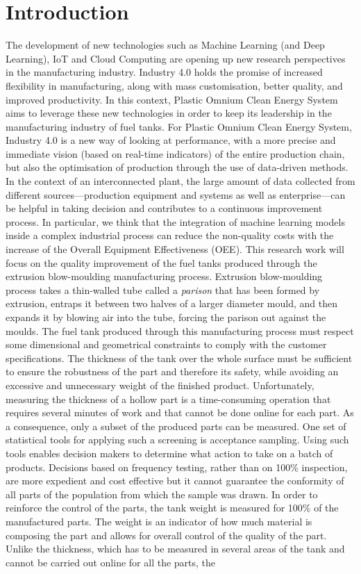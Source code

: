 \chapter*{Introduction}
\thispagestyle{empty}


The development of new technologies such as Machine Learning (and Deep Learning), IoT and Cloud Computing are opening up new research perspectives in the manufacturing industry. Industry 4.0 holds the promise of increased flexibility in manufacturing, along with mass customisation, better quality, and improved productivity. In this context, Plastic Omnium Clean Energy System aims to leverage these new technologies in order to keep its leadership in the manufacturing industry of fuel tanks. For Plastic Omnium Clean Energy System, Industry 4.0 is a new way of looking at performance, with a more precise and immediate vision (based on real-time indicators) of the entire production chain, but also the optimisation of production through the use of data-driven methods. In the context of an interconnected plant, the large amount of data collected from different sources—production equipment and systems as well as enterprise—can be helpful in taking decision and contributes to a continuous improvement process. In particular, we think that the integration of machine learning models inside a complex industrial process can reduce the non-quality costs with the increase of the Overall Equipment Effectiveness (OEE). This research work will focus on the quality improvement of the fuel tanks produced through the extrusion blow-moulding manufacturing process. Extrusion blow-moulding process takes a thin-walled tube called a \textit{parison} that has been formed by extrusion, entraps it between two halves of a larger diameter mould, and then expands it by blowing air into the tube, forcing the parison out against the moulds. The fuel tank produced through this manufacturing process must respect some dimensional and geometrical constraints to comply with the customer specifications. The thickness of the tank over the whole surface must be sufficient to ensure the robustness of the part and therefore its safety, while avoiding an excessive and unnecessary weight of the finished product. Unfortunately, measuring the thickness of a hollow part is a time-consuming operation that requires several minutes of work and that cannot be done online for each part. As a consequence, only a subset of the produced parts can be measured. One set of statistical tools for applying such a screening is acceptance sampling. Using such tools enables decision makers to determine what action to take on a batch of products. Decisions based on frequency testing, rather than on 100\% inspection, are more expedient and cost effective but it cannot guarantee the conformity of all parts of the population from which the sample was drawn. In order to reinforce the control of the parts, the tank weight is measured for 100\% of the manufactured parts. The weight is an indicator of how much material is composing the part and allows for overall control of the quality of the part. Unlike the thickness, which has to be measured in several areas of the tank and cannot be carried out online for all the parts, the 